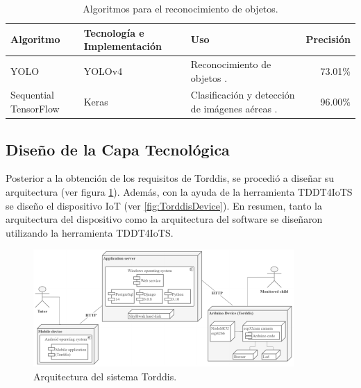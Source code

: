 \documentclass[a4paper,fleqn]{cas-sc}
\begin{document}
		\begin{table}[ht!]
			\caption{Algoritmos para el reconocimiento de objetos.}
			\label{tab:object-recognition}
			\centering
			\begin{tabular}{p{}p{}p{}p{}}
				\hline
				\multicolumn{1}{l}{\textbf{Algoritmo}} & \multicolumn{1}{l}{\textbf{Tecnología e Implementación}} & \multicolumn{1}{l}{\textbf{Uso}} & \multicolumn{1}{l}{\textbf{Precisión}} \\ \hline
				YOLO & YOLOv4 & Reconocimiento de objetos \citep{Liu2021Objetcs}. & \multicolumn{1}{r}{73.01\%} \\
				Sequential TensorFlow & Keras & Clasificación y detección de imágenes aéreas \citep{Sudharshan2018Object}. & \multicolumn{1}{r}{96.00\%} \\ \hline
			\end{tabular}
		\end{table}
		
		\subsection{Diseño de la Capa Tecnológica}
			Posterior a la obtención de los requisitos de Torddis, se procedió a diseñar su arquitectura (ver figura \ref{fig:TorddisArchitecture}). Además, con la ayuda de la herramienta TDDT4IoTS \citep{Guerrero2024Test} se diseño el dispositivo IoT (ver \ref{fig:TorddisDevice}). En resumen, tanto la arquitectura del dispositivo como la arquitectura del software se diseñaron utilizando la herramienta TDDT4IoTS.
	
			\begin{figure}[hbt!]
				\centering
				\includegraphics[frame,scale=0.5, width=\linewidth]{figs/Figure_5}
				\caption{Arquitectura del sistema Torddis. \label{fig:TorddisArchitecture}}
			\end{figure} 
	
\end{document}
